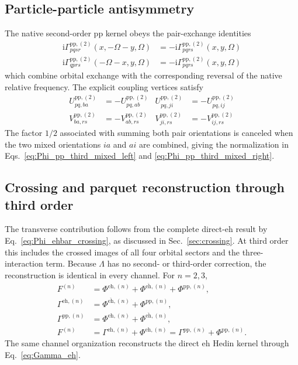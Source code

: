 \documentclass[aip,jcp,reprint,noshowkeys,superscriptaddress]{revtex4-1}
\newcommand{\ii}{\mathrm{i}}
\newcommand{\eh}{\text{eh}}
\newcommand{\teh}{\overline{\text{eh}}}
\newcommand{\pp}{\text{pp}}
\begin{document}
\subsection{Particle-particle antisymmetry}

The native second-order $\pp$ kernel obeys the pair-exchange identities
\begin{align}
    \ii\Gamma_{pqsr}^{\pp,(2)}(x,-\Omega-y,\Omega)
    &=
    -\ii\Gamma_{pqrs}^{\pp,(2)}(x,y,\Omega)
    \\
    \ii\Gamma_{qprs}^{\pp,(2)}(-\Omega-x,y,\Omega)
    &=
    -\ii\Gamma_{pqrs}^{\pp,(2)}(x,y,\Omega)
    \label{eq:Gamma_pp_pair_exchange}
\end{align}
which combine orbital exchange with the corresponding reversal of the native
relative frequency.
The explicit coupling vertices satisfy
\begin{align}
    U_{pq,ba}^{\pp,(2)}&=-U_{pq,ab}^{\pp,(2)}
    &
    U_{pq,ji}^{\pp,(2)}&=-U_{pq,ij}^{\pp,(2)}
    \\
    V_{ba,rs}^{\pp,(2)}&=-V_{ab,rs}^{\pp,(2)}
    &
    V_{ji,rs}^{\pp,(2)}&=-V_{ij,rs}^{\pp,(2)}
    \label{eq:UV_pp_antisymmetry}
\end{align}
The factor $1/2$ associated with summing both pair orientations is canceled
when the two mixed orientations $ia$ and $ai$ are combined, giving the
normalization in Eqs.~\eqref{eq:Phi_pp_third_mixed_left} and
\eqref{eq:Phi_pp_third_mixed_right}.


\subsection{Crossing and parquet reconstruction through third order}

The transverse contribution follows from the complete direct-$\eh$ result
by Eq.~\eqref{eq:Phi_ehbar_crossing}, as discussed in
Sec.~\ref{sec:crossing}. At third order this includes the crossed images
of all four orbital sectors and the three-interaction term.
Because $\Lambda$ has no second- or third-order correction, the reconstruction
is identical in every channel. For $n=2,3$,
\begin{align}
F^{(n)}&=\Phi^{\eh,(n)}+\Phi^{\teh,(n)}+\Phi^{\pp,(n)},
\\
\Gamma^{\eh,(n)}&=\Phi^{\teh,(n)}+\Phi^{\pp,(n)},
\\
\Gamma^{\pp,(n)}&=\Phi^{\eh,(n)}+\Phi^{\teh,(n)},
\label{eq:parquet_order_reconstruction}
\\
F^{(n)}&=\Gamma^{\eh,(n)}+\Phi^{\eh,(n)}
=\Gamma^{\pp,(n)}+\Phi^{\pp,(n)}.
\label{eq:channel_consistency_through_third}
\end{align}
The same channel organization reconstructs the direct $\eh$ Hedin kernel
through Eq.~\eqref{eq:Gamma_eh}.
\end{document}
